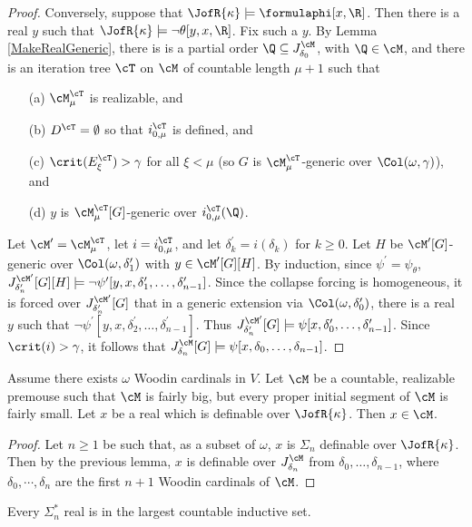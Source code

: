 \begin{proof}
Conversely, suppose that $\JofR{\kappa}\models\formulaphi[x,\R]$.
Then there is a real $y$ such that
$\JofR{\kappa}\models\neg\theta[y,x,\R]$. Fix such a $y$.
By Lemma \ref{MakeRealGeneric}, there is
is a partial order $\Q\subseteq J^{\cM}_{\delta_0}$, with
$\Q\in \cM$, and there is an
iteration tree $\cT$ on $\cM$ of countable length $\mu+1$ such that
\begin{itemize}
\item[(a)] $\cM^{\cT}_{\mu}$ is realizable, and
\item[(b)] $D^{\cT}=\emptyset$ so that $i^{\cT}_{0,\mu}$ is defined,
and
\item[(c)] $\crit(E^{\cT}_{\xi}) > \gamma$ for all $\xi<\mu$
(so $G$ is $\cM^{\cT}_{\mu}$-generic over $\Col(\omega,\gamma)$), and
\item[(d)] $y$ is $\cM^{\cT}_{\mu}[G]$-generic over
$i^{\cT}_{0,\mu}(\Q)$.
\end{itemize}
Let $\cM^{\prime}=\cM^{\cT}_{\mu}$, let $i=i^{\cT}_{0,\mu}$, and
let $\delta_k^{\prime}=i(\delta_k)$ for $k\geq 0$.
Let $H$ be $\cM^{\prime}[G]$-generic
over $\Col(\omega,\delta_1^{\prime})$ with $y\in\cM^{\prime}[G][H]$.
By induction, since $\psi^{\prime}=\psi_{\theta}$,
$J_{\delta_n^{\prime}}^{\cM^{\prime}}[G][H]\models
\neg\psi^{\prime}[y,x,\delta_1^{\prime},\dots,\delta^{\prime}_{n-1}]$.
Since the collapse forcing is homogeneous, it is forced over
$J_{\delta_n^{\prime}}^{\cM^{\prime}}[G]$
that in a generic
extension via $\Col(\omega,\delta_0^{\prime})$, there is a real $y$ such
that $\neg\psi^{\prime}[y,x,\delta_2^{\prime},\dots,\delta_{n-1}^{\prime}]$.
Thus $J_{\delta_n^{\prime}}^{\cM^{\prime}}[G]\models
\psi[x,\delta_0^{\prime},\dots,\delta_{n-1}^{\prime}]$.
Since $\crit(i)>\gamma$, it follows that
$J_{\delta_n}^{\cM}[G]\models
\psi[x,\delta_0,\dots,\delta_{n-1}]$.
\end{proof}

\begin{theorem}
Assume there exists $\omega$ Woodin cardinals in $V$. Let $\cM$ be
a countable, realizable premouse such that $\cM$ is fairly big,
but every proper initial segment of $\cM$ is fairly small.
Let $x$ be a real which is definable over $\JofR{\kappa}$.
Then $x\in\cM$.
\end{theorem}
\begin{proof}
Let $n\geq1$ be such that, as a subset of $\omega$,
 $x$ is $\Sigma_n$ definable over
$\JofR{\kappa}$. Then by the previous lemma, $x$ is definable
over $J_{\delta_n}^{\cM}$ from $\delta_0,\dots,\delta_{n-1}$,
where $\delta_0,\cdots,\delta_n$ are the first $n+1$ Woodin cardinals
of $\cM$.
\end{proof}

\begin{corollary}
Every $\Sigma^*_n$ real is in the largest countable inductive set.
\end{corollary}
